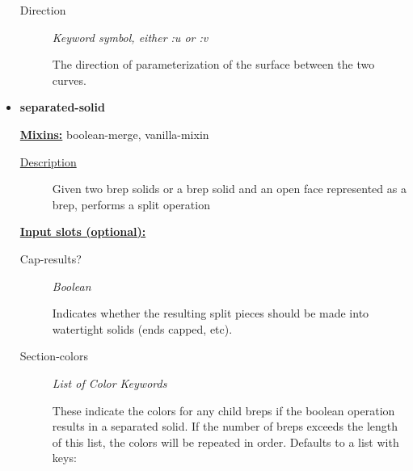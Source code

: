 \documentclass [11pt]{book}
\begin{document}
\begin{itemize}
\begin{description}
\item [Direction]
\emph{Keyword symbol, either :u or :v}

 The direction of parameterization of the surface between the two curves.




\end{description}







\item {}
\label{prim:separated-solid}
\textbf{separated-solid}


\textbf{
\underline{Mixins:}} boolean-merge, vanilla-mixin





\begin{description}

\item [
\underline{Description}]


Given two brep solids or a brep solid and an open face represented as a brep,
performs a split operation



\end{description}








\textbf{
\underline{Input slots (optional):}}

\begin{description}

\item [Cap-results?]
\emph{Boolean}

 Indicates whether the resulting split pieces should be made into watertight solids (ends capped, etc).




\item [Section-colors]
\emph{List of Color Keywords}

 These indicate the colors for any child breps if the boolean operation results in
a separated solid. If the number of breps exceeds the length of this list, the colors will be
repeated in order. Defaults to a list with keys:


\begin{itemize}


\end{itemize}
\end{description}
\end{itemize}
\end{document}
